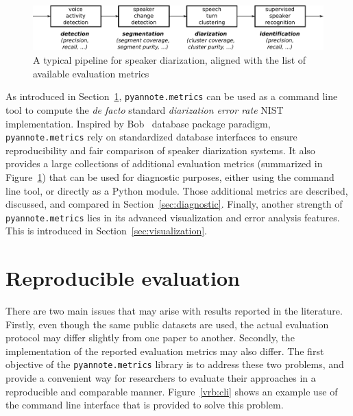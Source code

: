 \documentclass[a4paper]{article}
\newcommand*\metrics{\texttt{\footnotesize{pyannote.metrics}}}
\begin{document}
\begin{figure}[htb]
  \centering
  \includegraphics[width=0.8\linewidth]{figures/pipeline.pdf}
  \caption{A typical pipeline for speaker diarization, aligned with the list of available evaluation metrics }
  \label{fig:pipeline}
\end{figure}

As introduced in Section~\ref{sec:reproducible_evaluation}, \metrics{} can be used as a command line tool to compute the \emph{de facto} standard \emph{diarization error rate} NIST implementation.
Inspired by Bob~\cite{Bob2012} database package paradigm, \metrics{} rely on standardized database interfaces to ensure reproducibility and fair comparison of speaker diarization systems.
It also provides a large collections of additional evaluation metrics (summarized in Figure~\ref{fig:pipeline}) that can be used for diagnostic purposes, either using the command line tool, or directly as a Python module.
Those additional metrics are described, discussed, and compared in Section~\ref{sec:diagnostic}.
Finally, another strength of \metrics{} lies in its advanced visualization and error analysis features.
This is introduced in Section~\ref{sec:visualization}.

\section{Reproducible evaluation}
\label{sec:reproducible_evaluation}

There are two main issues that may arise with results reported in the literature.
Firstly, even though the same public datasets are used, the actual evaluation protocol may differ slightly from one paper to another.
Secondly, the implementation of the reported evaluation metrics may also differ.
The first objective of the \metrics{} library is to address these two problems, and provide a convenient way for researchers to evaluate their approaches in a reproducible and comparable manner.
Figure~\ref{vrb:cli} shows an example use of the command line interface that is provided to solve this problem.
\end{document}

